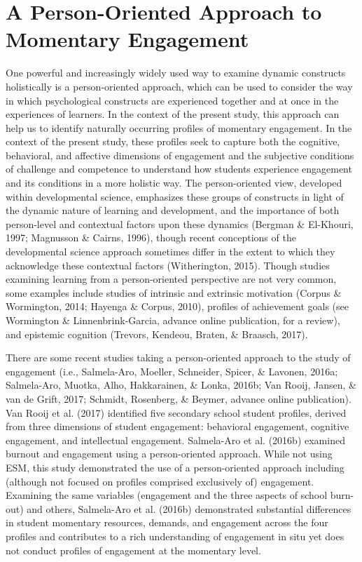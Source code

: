 \documentclass[]{book}
\theoremstyle{definition}
\theoremstyle{definition}
\theoremstyle{definition}
\theoremstyle{remark}
\begin{document}
\section{A Person-Oriented Approach to Momentary
Engagement}\label{a-person-oriented-approach-to-momentary-engagement}

One powerful and increasingly widely used way to examine dynamic
constructs holistically is a person-oriented approach, which can be used
to consider the way in which psychological constructs are experienced
together and at once in the experiences of learners. In the context of
the present study, this approach can help us to identify naturally
occurring profiles of momentary engagement. In the context of the
present study, these profiles seek to capture both the cognitive,
behavioral, and affective dimensions of engagement and the subjective
conditions of challenge and competence to understand how students
experience engagement and its conditions in a more holistic way. The
person-oriented view, developed within developmental science, emphasizes
these groups of constructs in light of the dynamic nature of learning
and development, and the importance of both person-level and contextual
factors upon these dynamics (Bergman \& El-Khouri, 1997; Magnusson \&
Cairns, 1996), though recent conceptions of the developmental science
approach sometimes differ in the extent to which they acknowledge these
contextual factors (Witherington, 2015). Though studies examining
learning from a person-oriented perspective are not very common, some
examples include studies of intrinsic and extrinsic motivation (Corpus
\& Wormington, 2014; Hayenga \& Corpus, 2010), profiles of achievement
goals (see Wormington \& Linnenbrink-Garcia, advance online publication,
for a review), and epistemic cognition (Trevors, Kendeou, Braten, \&
Braasch, 2017).

There are some recent studies taking a person-oriented approach to the
study of engagement (i.e., Salmela-Aro, Moeller, Schneider, Spicer, \&
Lavonen, 2016a; Salmela-Aro, Muotka, Alho, Hakkarainen, \& Lonka, 2016b;
Van Rooij, Jansen, \& van de Grift, 2017; Schmidt, Rosenberg, \& Beymer,
advance online publication). Van Rooij et al. (2017) identified five
secondary school student profiles, derived from three dimensions of
student engagement: behavioral engagement, cognitive engagement, and
intellectual engagement. Salmela-Aro et al. (2016b) examined burnout and
engagement using a person-oriented approach. While not using ESM, this
study demonstrated the use of a person-oriented approach including
(although not focused on profiles comprised exclusively of) engagement.
Examining the same variables (engagement and the three aspects of school
burn-out) and others, Salmela-Aro et al. (2016b) demonstrated
substantial differences in student momentary resources, demands, and
engagement across the four profiles and contributes to a rich
understanding of engagement in situ yet does not conduct profiles of
engagement at the momentary level.
\end{document}
